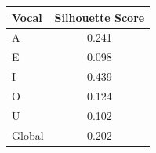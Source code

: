 \begin{tabular}{lc}
\toprule
\rowcolor{col01}
Vocal & Silhouette Score \\
\midrule
A & 0.241 \\
E & 0.098 \\
I & 0.439 \\
O & 0.124 \\
U & 0.102 \\
Global & 0.202 \\
\bottomrule
\end{tabular}
